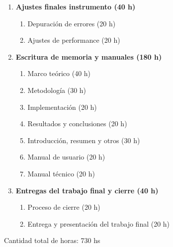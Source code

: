 \begin{enumerate}
	\item \textbf{Ajustes finales instrumento (40 h)}
	\begin{enumerate}
		\item Depuración de errores (20 h)
		\item Ajustes de performance (20 h)
	\end{enumerate}
	
	\item \textbf{Escritura de memoria y manuales (180 h)}
	\begin{enumerate}
		\item Marco teórico (40 h)
		\item Metodología (30 h)
		\item Implementación (20 h)
		\item Resultados y conclusiones (20 h)
		\item Introducción, resumen y otros (30 h)
		\item Manual de usuario (20 h)
		\item Manual técnico (20 h)
	\end{enumerate}
	
	\item \textbf{Entregas del trabajo final y cierre (40 h)}
	\begin{enumerate}
		\item Proceso de cierre (20 h)
		\item Entrega y presentación del trabajo final (20 h)
	\end{enumerate}
\end{enumerate}


Cantidad total de horas: 730 hs


